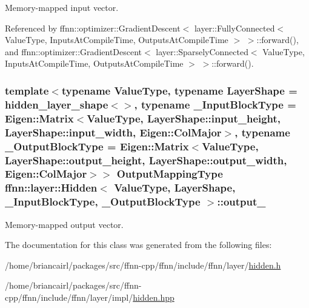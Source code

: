Memory-\/mapped input vector. 



Referenced by ffnn\-::optimizer\-::\-Gradient\-Descent$<$ layer\-::\-Fully\-Connected$<$ Value\-Type, Inputs\-At\-Compile\-Time, Outputs\-At\-Compile\-Time $>$ $>$\-::forward(), and ffnn\-::optimizer\-::\-Gradient\-Descent$<$ layer\-::\-Sparsely\-Connected$<$ Value\-Type, Inputs\-At\-Compile\-Time, Outputs\-At\-Compile\-Time $>$ $>$\-::forward().

\hypertarget{classffnn_1_1layer_1_1_hidden_adf9818c784dccc1860fe8384264cc4be}{
\subsubsection[{output\-\_\-}]{\setlength{\rightskip}{0pt plus 5cm}template$<$typename Value\-Type, typename Layer\-Shape = hidden\-\_\-layer\-\_\-shape$<$$>$, typename \-\_\-\-Input\-Block\-Type = Eigen\-::\-Matrix$<$\-Value\-Type, Layer\-Shape\-::input\-\_\-height,  Layer\-Shape\-::input\-\_\-width,  Eigen\-::\-Col\-Major$>$, typename \-\_\-\-Output\-Block\-Type = Eigen\-::\-Matrix$<$\-Value\-Type, Layer\-Shape\-::output\-\_\-height, Layer\-Shape\-::output\-\_\-width, Eigen\-::\-Col\-Major$>$$>$ {\bf Output\-Mapping\-Type} {\bf ffnn\-::layer\-::\-Hidden}$<$ Value\-Type, Layer\-Shape, \-\_\-\-Input\-Block\-Type, \-\_\-\-Output\-Block\-Type $>$\-::output\-\_\-\hspace{0.3cm}{\ttfamily [protected]}}}\label{classffnn_1_1layer_1_1_hidden_adf9818c784dccc1860fe8384264cc4be}


Memory-\/mapped output vector. 



The documentation for this class was generated from the following files\-:\begin{DoxyCompactItemize}
\item 
/home/briancairl/packages/src/ffnn-\/cpp/ffnn/include/ffnn/layer/\hyperlink{hidden_8h}{hidden.\-h}\item 
/home/briancairl/packages/src/ffnn-\/cpp/ffnn/include/ffnn/layer/impl/\hyperlink{hidden_8hpp}{hidden.\-hpp}\end{DoxyCompactItemize}
